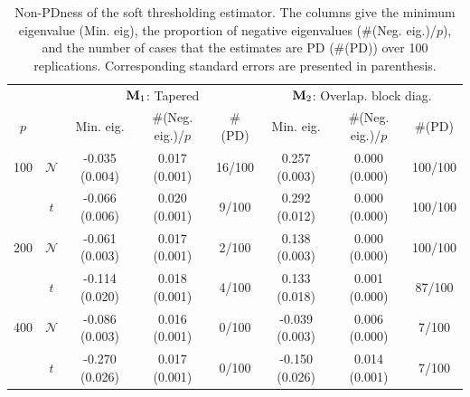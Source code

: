 \documentclass[times,sort&compress,3p]{elsarticle}
\begin{document}
\begin{table}[htb!]
{
\begin{center}
\begin{tabular}{cc|ccc|ccc}
\hline
& & \multicolumn{3}{c|}{${\bf M}_1$: Tapered}& \multicolumn{3}{c}{${\bf M}_2$: Overlap. block diag.} \\
$p$ & & Min. eig. & \#(Neg. eig.)/$p$ & \#(PD) & Min. eig. & \#(Neg. eig.)/$p$ & \#(PD)  \\
\hline
 100 & $\mathcal{N}$  & -0.035 (0.004) & 0.017 (0.001) & 16/100 & 0.257 (0.003) & 0.000 (0.000) & 100/100 \\
     & $t$  & -0.066 (0.006) & 0.020 (0.001) & 9/100 & 0.292 (0.012) & 0.000 (0.000) & 100/100 \\
\hline
 200 & $\mathcal{N}$  & -0.061 (0.003) & 0.017 (0.001) & 2/100 & 0.138 (0.003) & 0.000 (0.000) & 100/100 \\
     & $t$  & -0.114 (0.020) & 0.018 (0.001) & 4/100 & 0.133 (0.018) & 0.001 (0.000) & 87/100 \\
\hline
 400 & $\mathcal{N}$  & -0.086 (0.003) & 0.016 (0.001) & 0/100 & -0.039 (0.003) & 0.006 (0.000) & 7/100 \\
     & $t$  & -0.270 (0.026) & 0.017 (0.001) & 0/100 & -0.150 (0.026) & 0.014 (0.001) & 7/100 \\
\hline
\end{tabular}
\caption{Non-PDness of the soft thresholding estimator. The columns give the minimum eigenvalue (Min. eig),
the proportion of negative eigenvalues (\#(Neg. eig.)/$p$), and the number of cases that the estimates are PD (\#(PD)) over
100 replications. Corresponding standard errors are presented in parenthesis.}
\label{table:softspectrum}
\end{center}
}
\end{table}
\end{document}
